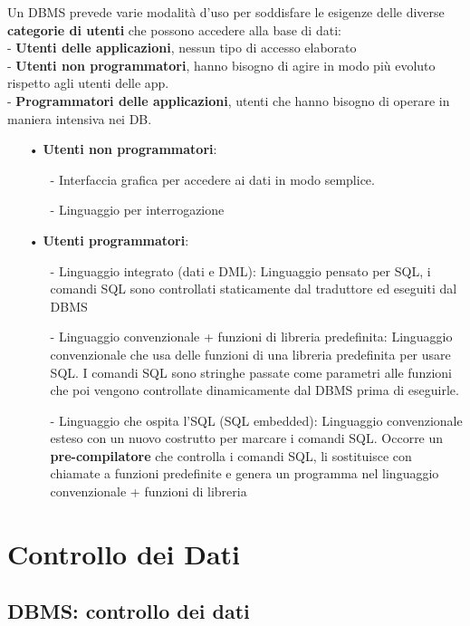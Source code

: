 \documentclass[12pt, letterpaper]{article}
\begin{document}
Un DBMS prevede varie modalità d’uso per soddisfare le esigenze delle diverse
\textbf{categorie di utenti} che possono accedere alla base di dati:\\
- \textbf{Utenti delle applicazioni}, nessun tipo di accesso elaborato\\
- \textbf{Utenti non programmatori}, hanno bisogno di agire in modo più evoluto rispetto agli utenti delle app.\\
- \textbf{Programmatori delle applicazioni}, utenti che hanno bisogno di operare in maniera intensiva nei DB.\\
\begin{itemize}
   \item[•] \textbf{Utenti non programmatori}:
      \begin{itemize}
         \item[-] Interfaccia grafica per accedere ai dati in modo semplice.
         \item[-] Linguaggio per interrogazione
      \end{itemize}
   \item[•] \textbf{Utenti programmatori}:
      \begin{itemize}
         \item[-] Linguaggio integrato (dati e DML): Linguaggio pensato per SQL, i comandi SQL sono controllati staticamente dal traduttore ed eseguiti dal DBMS
         \item[-] Linguaggio convenzionale + funzioni di libreria predefinita: Linguaggio convenzionale che usa delle funzioni di una libreria predefinita
per usare SQL. I comandi SQL sono stringhe passate come parametri alle
funzioni che poi vengono controllate dinamicamente dal DBMS prima di
eseguirle.
         \item[-] Linguaggio che ospita l'SQL (SQL embedded): Linguaggio convenzionale esteso con un nuovo costrutto per marcare i
            comandi SQL. Occorre un \textbf{pre-compilatore} che controlla i comandi SQL, li
sostituisce con chiamate a funzioni predefinite e genera un programma nel
linguaggio convenzionale + funzioni di libreria
      \end{itemize}
\end{itemize}

\section{Controllo dei Dati}

\subsection{DBMS: controllo dei dati}
\end{document}
